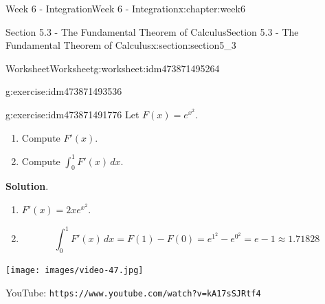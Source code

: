 \documentclass[oneside,10pt,]{book}
\newcommand{\blocktitlefont}{\relax}
\newcommand{\mono}[1]{\texttt{#1}}
\numberwithin{equation}{section}
\newlength{\qrsize}
\newlength{\previewwidth}
\begin{document}
\begin{chapterptx}{Week 6 - Integration}{}{Week 6 - Integration}{}{}{x:chapter:week6}
\begin{sectionptx}{Section 5.3 - The Fundamental Theorem of Calculus}{}{Section 5.3 - The Fundamental Theorem of Calculus}{}{}{x:section:section5_3}
\begin{worksheet-subsection}{Worksheet}{}{Worksheet}{}{}{g:worksheet:idm473871495264}
\begin{divisionexercise}{2}{}{}{g:exercise:idm473871493536}
\begin{equation*}
\end{equation*}
\end{divisionexercise}%
\begin{divisionexercise}{3}{}{}{g:exercise:idm473871491776}%
\footnotemark{}Let \(F(x) = e^{x^2}\).%
%
\begin{enumerate}[label=(\alph*)]
\item{}Compute \(F'(x)\).%
\item{}Compute \(\displaystyle \int_0^1 F'(x) \, dx\).%
\end{enumerate}
\textbf{\blocktitlefont Solution}.\hypertarget{g:solution:idm473871493280}{}\quad{}%
\begin{enumerate}[label=(\alph*)]
\item{}\(F'(x)=2xe^{x^2}\).%
\item{}%
\begin{equation*}
\int_0^1 F'(x) \, dx = F(1)-F(0) = e^{1^2}-e^{0^2} = e-1 \approx 1.71828
\end{equation*}
%
\end{enumerate}
\end{divisionexercise}%
%
\end{worksheet-subsection}
\restoregeometry
\setlength{\qrsize}{9em}
\setlength{\previewwidth}{\linewidth}
\addtolength{\previewwidth}{-\qrsize}
\begin{tcbraster}[raster columns=2, raster column skip=1pt, raster halign=center, raster force size=false, raster left skip=0pt, raster right skip=0pt]%
\begin{tcolorbox}[previewstyle, width=\previewwidth]%
\texttt{[image: images/video-47.jpg]}%
\end{tcolorbox}%
\begin{tcolorbox}[qrstyle]%
{\hypersetup{urlcolor=black}}%
\end{tcolorbox}%
\begin{tcolorbox}[captionstyle]%
\small YouTube: \mono{https://www.youtube.com/watch?v=kA17sSJRtf4}\end{tcolorbox}%
\end{tcbraster}%
\end{sectionptx}
\end{chapterptx}
%
%
\typeout{************************************************}
\typeout{************************************************}
%
\end{document}
